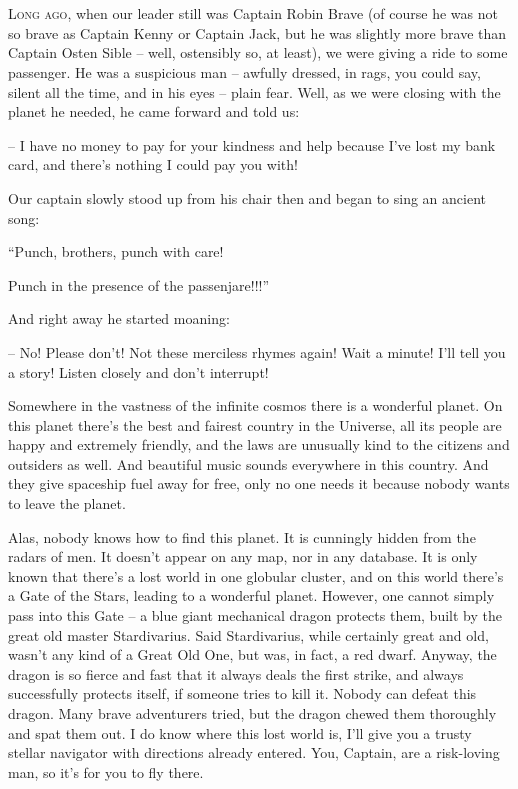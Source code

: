 \documentclass[ebook,twoside,final,openright]{memoir}
\begin{document}
\chapter{}
\par
\lettrine{L}{ong ago,} when our leader still was Captain Robin Brave (of course he was not so brave as Captain Kenny or Captain Jack, but he was slightly more brave than Captain Osten Sible – well, ostensibly so, at least), we were giving a ride to some passenger. He was a suspicious man – awfully dressed, in rags, you could say, silent all the time, and in his eyes – plain fear. Well, as we were closing with the planet he needed, he came forward and told us: \par
\par
– I have no money to pay for your kindness and help because I’ve lost my bank card, and there’s nothing I could pay you with!\par
Our captain slowly stood up from his chair then and began to sing an ancient song: \par
“Punch, brothers, punch with care! \par
 Punch in the presence of the passenjare!!!” \par
And right away he started moaning: \par
 – No! Please don’t! Not these merciless rhymes again! Wait a minute! I'll tell you a story! Listen closely and don’t interrupt!\par
\par
Somewhere in the vastness of the infinite cosmos there is a wonderful planet. On this planet there’s the best and fairest country in the Universe, all its people are happy and extremely friendly, and the laws are unusually kind to the citizens and outsiders as well. And beautiful music sounds everywhere in this country. And they give spaceship fuel away for free, only no one needs it because nobody wants to leave the planet. \par
Alas, nobody knows how to find this planet. It is cunningly hidden from the radars of men. It doesn’t appear on any map, nor in any database. It is only known that there’s a lost world in one globular cluster, and on this world there’s a Gate of the Stars, leading to a wonderful planet. However, one cannot simply pass into this Gate – a blue giant mechanical dragon protects them, built by the great old master Stardivarius. Said Stardivarius, while certainly great and old, wasn’t any kind of a Great Old One, but was, in fact, a red dwarf. Anyway, the dragon is so fierce and fast that it always deals the first strike, and always successfully protects itself, if someone tries to kill it. Nobody can defeat this dragon. Many brave adventurers tried, but the dragon chewed them thoroughly and spat them out. I do know where this lost world is, I'll give you a trusty stellar navigator with directions already entered. You, Captain, are a risk-loving man, so it’s for you to fly there.\par
\end{document}
